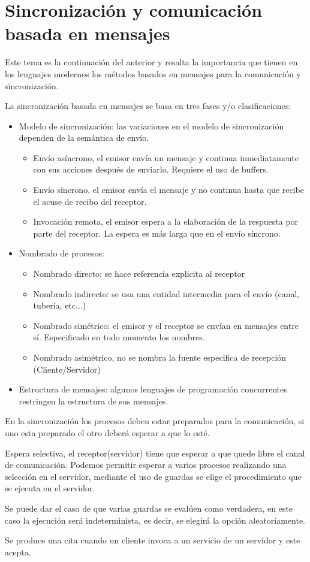 \section{Sincronización y comunicación basada en mensajes}

Este tema es la continuación del anterior y resalta la importancia que tienen en
los lenguajes modernos los métodos basados en mensajes para la comunicación y
sincronización.

La sincronización basada en mensajes se basa en tres fases y/o clasificaciones:

\begin{itemize}[a)]
	\item Modelo de sincronización: las variaciones en el modelo de
sincronización dependen de la semántica de envío.

	\begin{itemize}
		\item Envío asíncrono, el emisor envía un mensaje y continua
inmediatamente con sus acciones después de enviarlo. Requiere el uso de buffers.
		\item Envío síncrono, el emisor envía el mensaje y no continua
hasta que recibe el acuse de recibo del receptor.
		\item Invocación remota, el emisor espera a la elaboración de la
respuesta por parte del receptor. La espera es más larga que en el envío
síncrono.
	\end{itemize}

	\item Nombrado de procesos:
		\begin{itemize}
			\item Nombrado directo: se hace referencia explicita al
receptor
			\item Nombrado indirecto: se usa una entidad intermedia
para el envío (canal, tubería, etc...)
			\item Nombrado simétrico: el emisor y el receptor se
envían en mensajes entre sí. Especificado en todo momento los nombres.
			\item Nombrado asimétrico, no se nombra la fuente
especifica de recepción (Cliente/Servidor)
		\end{itemize}
	\item Estructura de mensajes: algunos lenguajes de programación
concurrentes restringen la estructura de sus mensajes.
\end{itemize}

En la sincronización los procesos deben estar preparados para la comunicación,
si uno esta preparado el otro deberá esperar a que lo esté.

Espera selectiva, el receptor(servidor) tiene que esperar a que quede libre el
canal de comunicación. Podemos permitir esperar a varios procesos realizando una
selección en el servidor, mediante el uso de guardas se elige el procedimiento
que se ejecuta en el servidor.

Se puede dar el caso de que varias guardas se evalúen como verdadera, en este
caso la ejecución será indeterminista, es decir, se elegirá la opción
aleatoriamente.

Se produce una cita cuando un cliente invoca a un servicio de un servidor y este
acepta.

